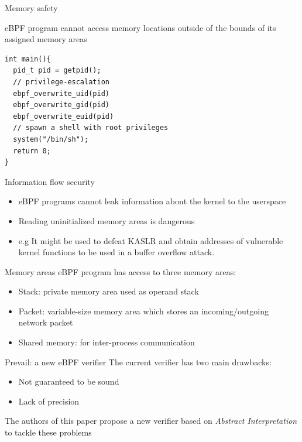 \documentclass[aspectratio=169]{beamer}
\begin{document}
\begin{frame}[fragile]{Memory safety}

  eBPF program cannot access memory locations outside of the bounds of its assigned memory areas
  \begin{lstlisting}[frame=single]
int main(){
  pid_t pid = getpid();
  // privilege-escalation
  ebpf_overwrite_uid(pid)
  ebpf_overwrite_gid(pid)
  ebpf_overwrite_euid(pid)
  // spawn a shell with root privileges
  system("/bin/sh");
  return 0;
}
\end{lstlisting}
\end{frame}

\begin{frame}{Information flow security}
  \begin{itemize}
    \item eBPF programs cannot leak information about the kernel to the userspace
    \item Reading uninitialized memory areas is dangerous
    \item e.g It might be used to defeat KASLR and obtain addresses of vulnerable kernel functions to
          be used in a buffer overflow attack.
  \end{itemize}
  \centering


\end{frame}

\begin{frame}{Memory areas}
  eBPF program has access to three memory areas:
  \begin{itemize}
    \item Stack: private memory area used as operand stack
    \item Packet: variable-size memory area which stores an incoming/outgoing network packet
    \item Shared memory: for inter-process communication
  \end{itemize}
\end{frame}

\begin{frame}{Prevail: a new eBPF verifier}
  The current verifier has two main drawbacks:
  \begin{itemize}
    \item Not guaranteed to be sound
    \item Lack of precision
  \end{itemize}
  The authors of this paper propose a new verifier based on \textit{Abstract Interpretation} to tackle these
  problems
\end{frame}
\end{document}
